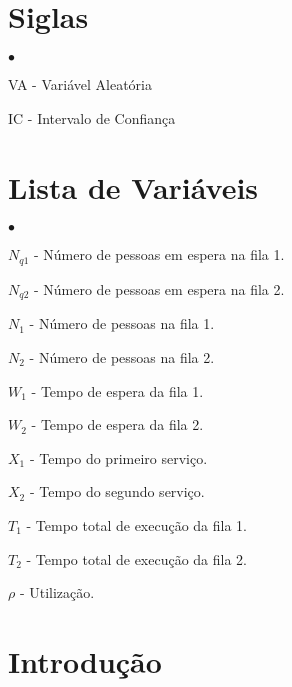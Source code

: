 \documentclass[a4paper,12pt]{report}
\begin{document}



\begin{abstract}
\end{abstract}

\chapter*{Siglas}
\begin{list}{$\bullet$}{}
  \item[VA] - Variável Aleatória
  \item[IC] - Intervalo de Confiança
\end{list}

\chapter*{Lista de Variáveis}
\begin{list}{$\bullet$}{}
  \item[$N_{q1}$] - Número de pessoas em espera na fila 1.
  \item[$N_{q2}$] - Número de pessoas em espera na fila 2.
  \item[$N_1$] - Número de pessoas na fila 1.
  \item[$N_2$] - Número de pessoas na fila 2.
  \item[$W_1$] - Tempo de espera da fila 1.
  \item[$W_2$] - Tempo de espera da fila 2.
  \item[$X_1$] - Tempo do primeiro serviço.
  \item[$X_2$] - Tempo do segundo serviço.
  \item[$T_1$] - Tempo total de execução da fila 1.
  \item[$T_2$] - Tempo total de execução da fila 2.
  \item[$\rho$] - Utilização.
\end{list}

\tableofcontents

\listoffigures

\listoftables

\chapter{Introdução}
\end{document}
